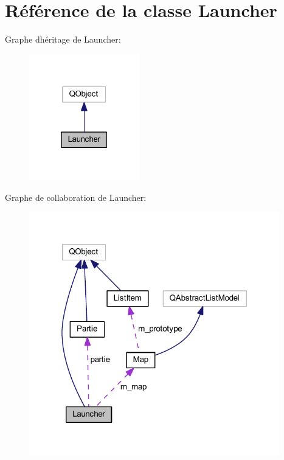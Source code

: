 \hypertarget{class_launcher}{}\section{Référence de la classe Launcher}
\label{class_launcher}


Graphe d\textquotesingle{}héritage de Launcher\+:
\nopagebreak
\begin{figure}[H]
\begin{center}
\leavevmode
\includegraphics[width=136pt]{class_launcher__inherit__graph}
\end{center}
\end{figure}


Graphe de collaboration de Launcher\+:
\nopagebreak
\begin{figure}[H]
\begin{center}
\leavevmode
\includegraphics[width=308pt]{class_launcher__coll__graph}
\end{center}
\end{figure}

